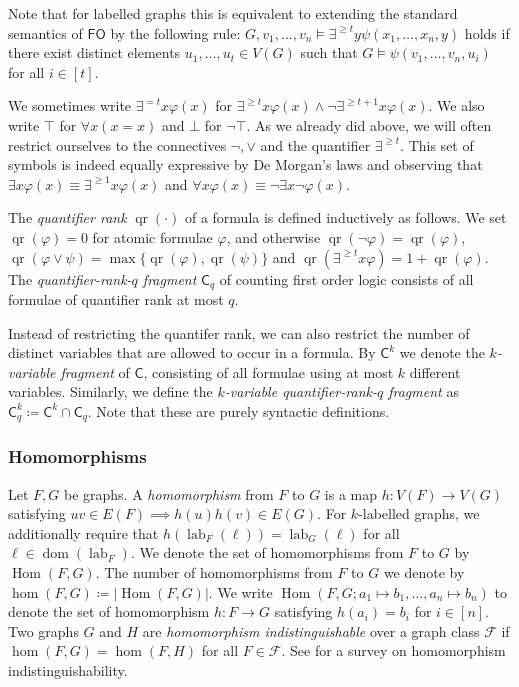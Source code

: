 \documentclass{lmcs}
\theoremstyle{plain}\newtheorem{claim}[thm]{Claim}   %
\DeclareMathOperator{\qr}{qr}
\DeclareMathOperator{\dom}{dom}
\DeclareMathOperator{\HOM}{Hom}
\newcommand	{\homInd}			{homomorphism indistinguishability}
\newcommand{\lFO}{\ensuremath{\mathsf{FO}}}
\newcommand{\lC} {\ensuremath{\mathsf C}}
\DeclareMathOperator{\labfkt}{lab}
\begin{document}
Note that for labelled graphs this is equivalent to extending the standard semantics of $\lFO$ by the following rule: $G, v_1, \dots, v_n \models \exists^{{\geq} t}y \psi(x_1, \dots, x_n, y)$ holds if there exist distinct elements $u_1, \dots, u_t \in V(G)$ such that $G \models \psi(v_1, \dots, v_n, u_i)$ for all $i \in [t]$.

We sometimes write $\exists^{=t}x \varphi(x)$ for $\exists^{{\geq} t} x \varphi(x) \land \neg\exists^{{\geq} t+1}x \varphi(x)$. We also write $\top$ for $\forall x (x=x)$ and $\bot$ for $\neg \top$.
As we already did above, we will often restrict ourselves to the connectives $\neg, \lor$ and the quantifier $\exists^{{\geq} t}$. This set of symbols is indeed equally expressive by De Morgan's laws and observing that $\exists x \varphi(x) \equiv \exists^{{\geq} 1}x \varphi(x)$ and $\forall x \varphi(x) \equiv \neg\exists x \neg\varphi(x)$.

The \emph{quantifier rank} $\qr(\cdot)$ of a formula is defined inductively as follows.
We set $\qr(\varphi) = 0$ for atomic formulae $\varphi$, and otherwise $\qr(\neg\varphi) = \qr(\varphi)$, $\qr(\varphi \lor \psi) = \max \{ \qr(\varphi), \qr(\psi)\}$ and $\qr(\exists^{{\geq} t}x \varphi) = 1 + \qr(\varphi)$.
The \emph{quantifier-rank-$q$ fragment} $\lC_q$ of counting first order logic consists of all formulae of quantifier rank at most $q$.

Instead of restricting the quantifer rank, we can also restrict the number of distinct variables that are allowed to occur in a formula. By $\lC^k$ we denote the \emph{$k$-variable fragment} of $\lC$, consisting of all formulae using at most $k$ different variables. Similarly, we define the \emph{$k$-variable quantifier-rank-$q$ fragment} as $\lC^k_q \coloneqq \lC^k \cap \lC_q$. Note that these are purely syntactic definitions.

\subsubsection{Homomorphisms}

Let $F,G$ be graphs.
A \emph{homomorphism} from $F$ to $G$ is a map $h \colon V(F) \to V(G)$ satisfying $uv \in E(F) \implies h(u)h(v) \in E(G)$.
For $k$-labelled graphs, we additionally require that $h(\labfkt_F(\ell)) = \labfkt_G(\ell)$ for all $\ell \in \dom(\labfkt_F)$.
We denote the set of homomorphisms from $F$ to $G$ by $\HOM(F, G)$.
The number of homomorphisms from $F$ to $G$ we denote by $\hom(F, G) \coloneqq \lvert \HOM(F, G) \rvert$.
We write $\HOM(F, G; a_1 \mapsto b_1, \dots, a_n \mapsto b_n)$ to denote the set of homomorphism $h\colon F \to G$ satisfying $h(a_i) = b_i$ for $i \in [n]$.
Two graphs $G$ and $H$ are \emph{homomorphism indistinguishable} over a graph class $\mathcal{F}$ if $\hom(F, G) = \hom(F, H)$ for all $F \in \mathcal{F}$.
See \cite{seppelt_homomorphism_2024} for a survey on \homInd.
\end{document}
